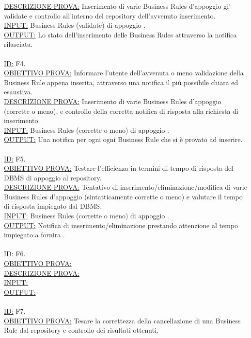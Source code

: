 \documentclass[11pt,titlepage,a4paper]{report}
\begin{document}
\underline{DESCRIZIONE PROVA:} Inserimento di varie Business Rules d'appoggio gi\a' validate e controllo all'interno del repository dell'avvenuto inserimento.\\
\underline{INPUT:} Business Rules (validate) di appoggio .\\
\underline{OUTPUT:} Lo stato dell'inserimento delle Business Rules attraverso la notifica rilasciata.\\
\\
\underline{ID:} F4.\\
\underline{OBIETTIVO PROVA:} Informare l'utente dell'avvenuta o meno validazione della Business Rule appena inserita, attraverso una notifica il pi\`u possibile chiara ed esaustiva. \\
\underline{DESCRIZIONE PROVA:} Inserimento di varie Business Rules d'appoggio (corrette o meno), e controllo della corretta notifica di risposta alla richiesta di inserimento.\\
\underline{INPUT:} Business Rules (corrette o meno) di appoggio .\\
\underline{OUTPUT:} Una notifica per ogni ogni Business Rule che si \`e provato ad inserire.\\
\\
\underline{ID:} F5.\\
\underline{OBIETTIVO PROVA:} Testare l'efficienza in termini di tempo di risposta del DBMS di appoggio al repository. \\
\underline{DESCRIZIONE PROVA:} Tentativo di inserimento/eliminazione/modifica di varie Business Rules d'appoggio (sintatticamente corrette o meno) e valutare il tempo di risposta impiegato dal DBMS.\\
\underline{INPUT:} Business Rules (corrette o meno) di appoggio .\\
\underline{OUTPUT:} Notifica di inserimento/eliminazione prestando attenzione al tempo impiegato a fornira .\\
\\
\underline{ID:} F6.\\
\underline{OBIETTIVO PROVA:}  \\
\underline{DESCRIZIONE PROVA:} \\
\underline{INPUT:} \\
\underline{OUTPUT:} \\
\\
\underline{ID:} F7.\\
\underline{OBIETTIVO PROVA:} Tesare la correttezza della cancellazione di una Business Rule dal repository e controllo dei risultati ottenuti. \\
\end{document}
